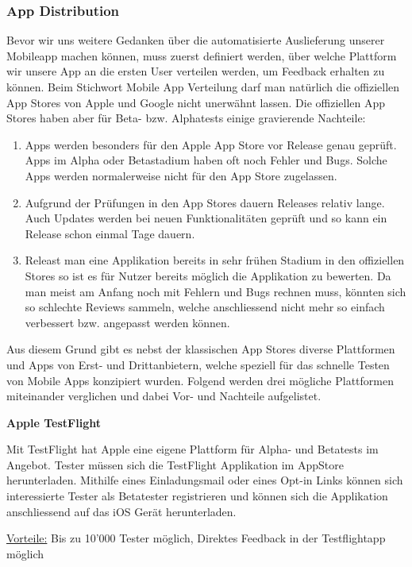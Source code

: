 \subsubsection{App Distribution}
Bevor wir uns weitere Gedanken über die automatisierte Auslieferung unserer Mobileapp machen können, muss zuerst definiert werden, über welche Plattform wir unsere App an die ersten User verteilen werden, um Feedback erhalten zu können. Beim Stichwort Mobile App Verteilung darf man natürlich die offiziellen App Stores von Apple und Google nicht unerwähnt lassen. Die offiziellen App Stores haben aber für Beta- bzw. Alphatests einige gravierende Nachteile:

\begin{enumerate}
    \item Apps werden besonders für den Apple App Store vor Release genau geprüft. Apps im Alpha oder Betastadium haben oft noch Fehler und Bugs. Solche Apps werden normalerweise nicht für den App Store zugelassen.
    \item Aufgrund der Prüfungen in den App Stores dauern Releases relativ lange. Auch Updates werden bei neuen Funktionalitäten geprüft und so kann ein Release schon einmal Tage dauern.
    \item Releast man eine Applikation bereits in sehr frühen Stadium in den offiziellen Stores so ist es für Nutzer bereits möglich die Applikation zu bewerten. Da man meist am Anfang noch mit Fehlern und Bugs rechnen muss, könnten sich so schlechte Reviews sammeln, welche anschliessend nicht mehr so einfach verbessert bzw. angepasst werden können.
\end{enumerate}

Aus diesem Grund gibt es nebst der klassischen App Stores diverse Plattformen und Apps von Erst- und Drittanbietern, welche speziell für das schnelle Testen von Mobile Apps konzipiert wurden. Folgend werden drei mögliche Plattformen miteinander verglichen und dabei Vor- und Nachteile aufgelistet.

\textbf{Apple TestFlight}

Mit TestFlight hat Apple eine eigene Plattform für Alpha- und Betatests im Angebot. Tester müssen sich die TestFlight Applikation im AppStore herunterladen. Mithilfe eines Einladungsmail oder eines Opt-in Links können sich interessierte Tester als Betatester registrieren und können sich die Applikation anschliessend auf das iOS Gerät herunterladen.

\underline{Vorteile:} Bis zu 10'000 Tester möglich, Direktes Feedback in der Testflightapp möglich


